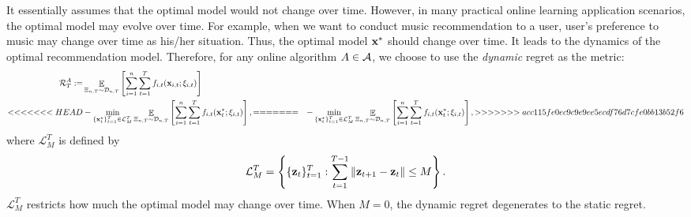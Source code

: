 \documentclass{article}
\def\rc{\color {red}}
\begin{document}
%
%
It essentially assumes that the optimal model would not change over time. However, in many practical online learning application scenarios, the optimal model may evolve over time. For example, when we want to conduct music recommendation to a user, user's preference to music may change over time as his/her situation.  Thus, the optimal model ${\bf x}^\ast$ should change over time. It leads to the dynamics of the optimal recommendation model. Therefore, for any online algorithm $A\in{\mathcal{A}}$, we choose to use the \emph{dynamic} regret as the metric:
\begin{align}
\nonumber
{\mathcal{R}}_T^{A} := & \mathop{\mathbb{E}}_{ \Xi_{n,T} \sim \mathcal{D}_{n,T} }  \left[\sum_{i=1}^n\sum_{t=1}^T f_{i,t}({\bf x}_{i,t};\xi_{i,t}) \right]
\\ \label{equa_definition_our_regret}
<<<<<<< HEAD
& - \min_{\{{\bf x}_t^\star\}_{t=1}^T \in \mathcal{L}_{M}^T}  \mathop{\mathbb{E}}_{ \Xi_{n,T} \sim \mathcal{D}_{n,T} } \left[\sum_{i=1}^n\sum_{t=1}^T f_{i,t}({\bf x}_t^\ast;\xi_{i,t}) \right],
=======
& - \min_{\{{\bf x}_t^\star\}_{t=1}^T \in \mathcal{L}_{M}^T}\mathop{\mathbb{E}}_{ \Xi_{n,T} \sim \mathcal{D}_{n,T} }  \left[\sum_{i=1}^n\sum_{t=1}^T f_{i,t}({\bf x}_t^\ast;\xi_{i,t}) \right],
>>>>>>> acc115fe0ec9c9e9ee5ecdf76d7cfe0bb13b52f6
\end{align}
where $\mathcal{L}_M^T$ is defined by
\begin{align}
\nonumber
{\mathcal{L}}_{M}^T = \left\{\{{\bf z}_t\}_{t=1}^T : \sum\limits_{t=1}^{T-1}\|{\bf z}_{t+1}-{\bf z}_t\|\le M \right\}.
\end{align} $\mathcal{L}_M^T$ restricts how much the optimal model may change over time. When $M=0$, the dynamic regret degenerates to the static regret.
\end{document}
